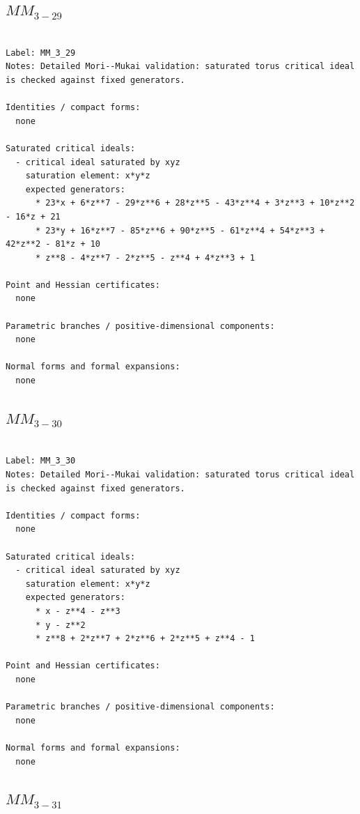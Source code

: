 \documentclass[10pt,a4paper]{article}
\begin{document}
\subsection*{$ MM_{3-29} $}

\begin{lstlisting}

Label: MM_3_29
Notes: Detailed Mori--Mukai validation: saturated torus critical ideal is checked against fixed generators.

Identities / compact forms:
  none

Saturated critical ideals:
  - critical ideal saturated by xyz
    saturation element: x*y*z
    expected generators:
      * 23*x + 6*z**7 - 29*z**6 + 28*z**5 - 43*z**4 + 3*z**3 + 10*z**2 - 16*z + 21
      * 23*y + 16*z**7 - 85*z**6 + 90*z**5 - 61*z**4 + 54*z**3 + 42*z**2 - 81*z + 10
      * z**8 - 4*z**7 - 2*z**5 - z**4 + 4*z**3 + 1

Point and Hessian certificates:
  none

Parametric branches / positive-dimensional components:
  none

Normal forms and formal expansions:
  none

\end{lstlisting}

\subsection*{$ MM_{3-30} $}

\begin{lstlisting}

Label: MM_3_30
Notes: Detailed Mori--Mukai validation: saturated torus critical ideal is checked against fixed generators.

Identities / compact forms:
  none

Saturated critical ideals:
  - critical ideal saturated by xyz
    saturation element: x*y*z
    expected generators:
      * x - z**4 - z**3
      * y - z**2
      * z**8 + 2*z**7 + 2*z**6 + 2*z**5 + z**4 - 1

Point and Hessian certificates:
  none

Parametric branches / positive-dimensional components:
  none

Normal forms and formal expansions:
  none

\end{lstlisting}

\subsection*{$ MM_{3-31} $}
\end{document}
